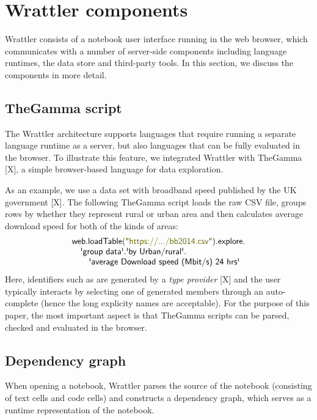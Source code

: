 \documentclass[sigplan]{acmart}\settopmatter{printfolios=true,printccs=false,printacmref=false}
\begin{document}
\section{Wrattler components}
\label{sec:comp}

Wrattler consists of a notebook user interface running in the web browser, which communicates 
with a number of server-side components including language runtimes, the data store and third-party 
tools. In this section, we discuss the components in more detail.

\subsection{TheGamma script}
\label{sec:comp-gamma}

The Wrattler architecture supports languages that require running a separate language runtime
as a server, but also languages that can be fully evaluated in the browser. To illustrate this
feature, we integrated Wrattler with TheGamma [X], a simple browser-based language for data
exploration.

As an example, we use a data set with broadband speed published by the UK government [X].
The following TheGamma script loads the raw CSV file, groups rows by whether they represent
rural or urban area and then calculates average download speed for both of the kinds of areas:
%
\begin{equation*}
\begin{array}{l}
\ident{web.loadTable}(\str{https://.../bb2014.csv}).\ident{explore}.\\
\quad\qident{group data}.\qident{by Urban/rural}.\\
\qquad\qident{average Download speed (Mbit/s) 24 hrs}  
\end{array}
\end{equation*}
%
Here, identifiers such as  are generated by a \emph{type provider} [X] 
and the user typically interacts by selecting one of generated members through an auto-complete
(hence the long explicity names are acceptable). For the purpose of this paper, the most 
important aspect is that TheGamma scripts can be parsed, checked and evaluated in the browser.

\subsection{Dependency graph}
\label{sec:comp-deps}

When opening a notebook, Wrattler parses the source of the notebook (consisting of text cells and
code cells) and constructs a dependency graph, which serves as a runtime representation of the
notebook. 
\end{document}
